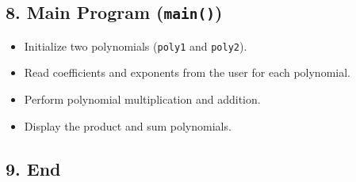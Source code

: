 \documentclass{article}
\begin{document}
\subsection*{8. Main Program (\texttt{main()})}

\begin{itemize}
  \item Initialize two polynomials (\texttt{poly1} and \texttt{poly2}).
  \item Read coefficients and exponents from the user for each polynomial.
  \item Perform polynomial multiplication and addition.
  \item Display the product and sum polynomials.
\end{itemize}

\subsection*{9. End}
\end{document}
